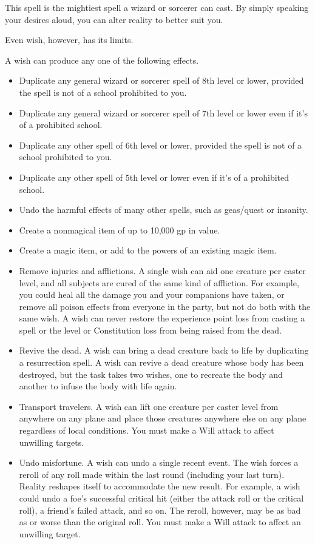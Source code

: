 \spelleffect This spell is the mightiest spell a wizard or sorcerer can cast. By simply speaking your desires aloud, you can alter reality to better suit you.
\par Even wish, however, has its limits.
\par A wish can produce any one of the following effects.
\begin{itemize}
    \item Duplicate any general wizard or sorcerer spell of 8th level or lower, provided the spell is not of a school prohibited to you.
    \item Duplicate any general wizard or sorcerer spell of 7th level or lower even if it's of a prohibited school.
    \item Duplicate any other spell of 6th level or lower, provided the spell is not of a school prohibited to you.
    \item Duplicate any other spell of 5th level or lower even if it's of a prohibited school. 
    \item Undo the harmful effects of many other spells, such as geas/quest or insanity.
    \item Create a nonmagical item of up to 10,000 gp in value.
    \item Create a magic item, or add to the powers of an existing magic item.
    \item Remove injuries and afflictions. A single wish can aid one creature per caster level, and all subjects are cured of the same kind of affliction. For example, you could heal all the damage you and your companions have taken, or remove all poison effects from everyone in the party, but not do both with the same wish. A wish can never restore the experience point loss from casting a spell or the level or Constitution loss from being raised from the dead.
    \item Revive the dead. A wish can bring a dead creature back to life by duplicating a resurrection spell. A wish can revive a dead creature whose body has been destroyed, but the task takes two wishes, one to recreate the body and another to infuse the body with life again.
    \item Transport travelers. A wish can lift one creature per caster level from anywhere on any plane and place those creatures anywhere else on any plane regardless of local conditions. You must make a Will attack to affect unwilling targets.
    \item Undo misfortune. A wish can undo a single recent event. The wish forces a reroll of any roll made within the last round (including your last turn). Reality reshapes itself to accommodate the new result. For example, a wish could undo a foe's successful critical hit (either the attack roll or the critical roll), a friend's failed attack, and so on. The reroll, however, may be as bad as or worse than the original roll. You must make a Will attack to affect an unwilling target.
\end{itemize}
